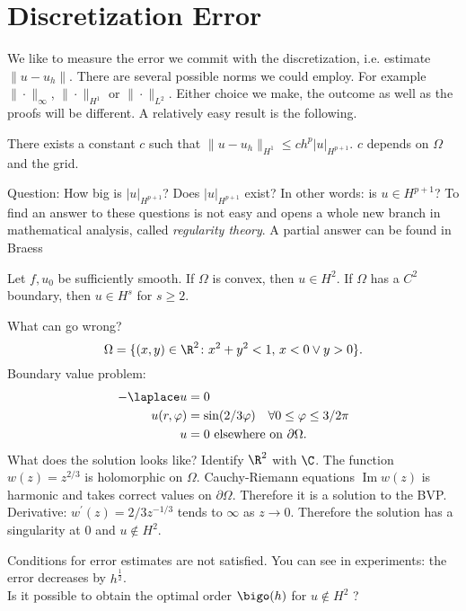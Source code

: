 \section{Discretization Error}
We like to measure the error we commit with the discretization, i.e. estimate $\| u-u_h\|$. There are several possible norms we could employ. For example $\|\cdot\|_\infty$, $\|\cdot\|_{H^1}$ or $\|\cdot\|_{L^2}$. Either choice we make, the outcome as well as the proofs will be different. A relatively easy result is the following.
\begin{theorem}
There exists a constant $c$ such that $\| u-u_h\|_{H^1}\leq ch^p| u|_{H^{p+1}}$. $c$ depends on $\Omega$ and the grid.
\end{theorem}
Question: How big is $| u|_{H^{p+1}}$? Does $| u|_{H^{p+1}}$ exist? In other words: is $u\in H^{p+1}$? To find an answer to these questions is not easy and opens a whole new branch in mathematical analysis, called \textit{regularity theory}. A partial answer can be found in Braess %
\begin{theorem}%
Let $f,u_0$ be sufficiently smooth. If $\Omega$ is convex, then $u\in H^2$. If $\Omega$ has a $C^2$ boundary, then $u\in H^s$ for $s\geq 2$.
\end{theorem}
\begin{example}
What can go wrong?
\begin{equation*}
	\Omega=\{(x,y)\in\R^2\colon x^2+y^2<1,\,x<0\lor y>0\}.
\end{equation*} 
Boundary value problem:
\begin{align*}
	-\laplace u&=0\\
	u(r,\varphi)&=\sin(2/3\varphi)\quad \forall 0\leq\varphi\leq3/2\pi \\
	u&=0 \text{ elsewhere on } \partial\Omega.
\end{align*}
What does the solution looks like? Identify $\R^2$ with $\C$. The function $w(z)=z^{2/3}$ is holomorphic on $\Omega$. Cauchy-Riemann equations $\operatorname{Im}w(z)$ is harmonic and takes correct values on $\partial\Omega$. Therefore it is a solution to the BVP. Derivative: $w^\prime(z)=2/3z^{-1/3}$ tends to $\infty$ as $z\to 0$. Therefore the solution has a singularity at $0$ and $u\notin H^2$.
\end{example}

Conditions for error estimates are not satisfied. You can see in experiments: the error decreases by $h^{\frac{1}{2}}$. \\
Is it possible to obtain the optimal order $\bigo(h)$ for $u \not \in H^2$ ?\\
